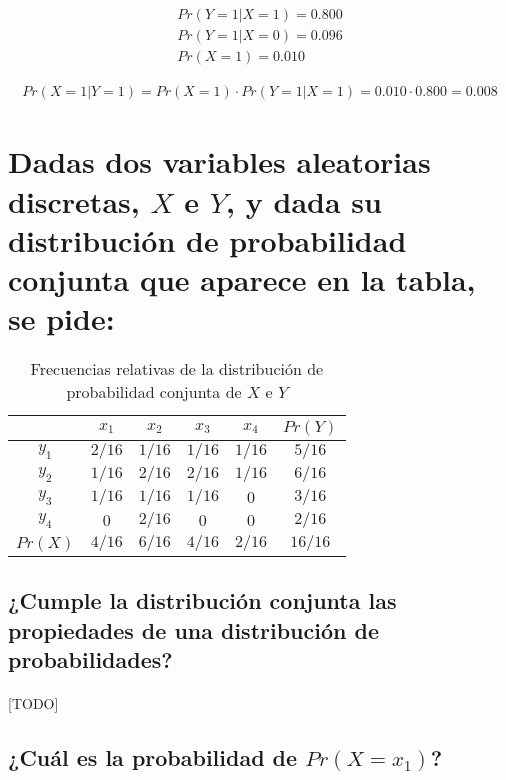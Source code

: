 \documentclass{article}
\begin{document}
		\begin{align}
			Pr(Y = 1 | X = 1) = 0.800 \\
			Pr(Y = 1 | X = 0) = 0.096 \\
			Pr(X = 1) = 0.010
		\end{align}


		\begin{align}
			Pr(X = 1 | Y = 1) = Pr(X = 1) \cdot Pr(Y = 1 | X = 1) = 0.010 \cdot 0.800 = 0.008
		\end{align}

	\section{Dadas dos variables aleatorias discretas, $X$ e $Y$, y dada su distribución de probabilidad conjunta que aparece en la tabla, se pide:}
	\label{sec:e2}

	\begin{table}
		\centering
		\begin{tabular}{ | c || c | c | c | c | c |}
			\hline
			 					& $x_1$ 	& $x_2$ 	& $x_3$ 	& $x_4$ 	& $Pr(Y)$ \\ \hline \hline
				$y_1$ 	&	$2/16$	&	$1/16$	&	$1/16$	&	$1/16$	&	$5/16$ 	\\ \hline
				$y_2$ 	&	$1/16$	&	$2/16$	&	$2/16$	&	$1/16$	&	$6/16$ 	\\ \hline
				$y_3$ 	&	$1/16$	&	$1/16$	&	$1/16$	&	$0$			&	$3/16$ 	\\ \hline
				$y_4$ 	&	$0$			&	$2/16$	&	$0$			&	$0$			&	$2/16$ 	\\ \hline
				$Pr(X)$ &	$4/16$	&	$6/16$	&	$4/16$	&	$2/16$	&	$16/16$ \\
			 \hline
		\end{tabular}
		\caption{Frecuencias relativas de la distribución de probabilidad conjunta de $X$ e $Y$}
		\label{table:e2}

	\end{table}

		\subsection{¿Cumple la distribución conjunta las propiedades de una distribución de probabilidades?}

			\paragraph{}
			[TODO]

		\subsection{¿Cuál es la probabilidad de $Pr(X = x_1)$?}
\end{document}
